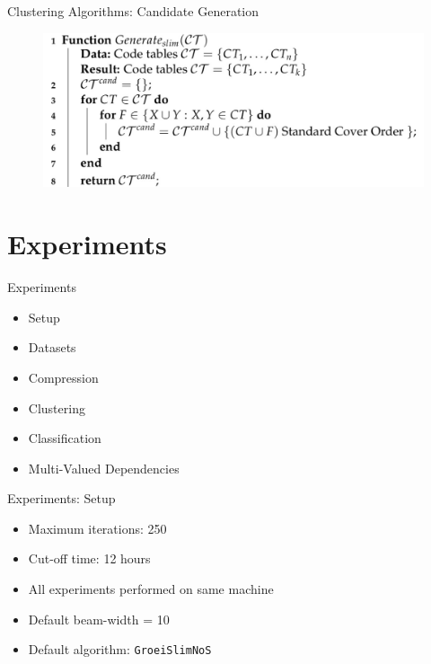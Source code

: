 \documentclass{beamer}
\begin{document}
\begin{frame}{Clustering Algorithms: Candidate Generation}
\begin{figure}[H]
  \centering
   \includegraphics[width=\textwidth]{img/genslim}
\end{figure}
\end{frame}

\section{Experiments}
\begin{frame}{Experiments}
	\begin{itemize}
		\item Setup
		\item Datasets
		\item Compression
		\item Clustering
		\item Classification
		\item Multi-Valued Dependencies
	\end{itemize}
\end{frame}

\begin{frame}{Experiments: Setup}
	\begin{itemize}
		\item Maximum iterations: 250
		\item Cut-off time: 12 hours
		\item All experiments performed on same machine
		\item Default beam-width = 10
		\item Default algorithm: \texttt{GroeiSlimNoS}
	\end{itemize}
\end{frame}
\end{document}
